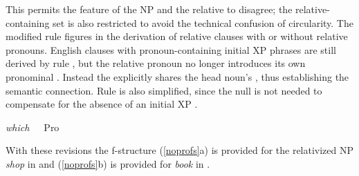 \documentclass[output=paper,hidelinks]{langscibook}
\begin{document}
\noindent This permits the \CASE feature of the NP and the relative  to disagree; the relative-containing \ADJ set is also restricted to avoid the technical confusion of circularity. The modified rule figures in the derivation of relative clauses with or without relative pronouns.    English clauses with pronoun-containing initial XP phrases are still derived by rule , but the relative pronoun no longer introduces its own pronominal \PRED {}.  Instead the  explicitly shares the head noun's \PRED, thus establishing the semantic connection.  Rule  is also simplified, since the null  is not needed to compensate for the absence of an initial XP .

\ea
\ea\label{whichnopro}
\textit{which}\ \ \ Pro\ \ \ 
\ex\label{restrictthat}
\\[1ex]
\z\z

\noindent With these revisions the f-structure (\ref{noprofs}a) is provided for the relativized NP \textit{shop} in  and (\ref{noprofs}b) is provided for \textit{book} in .
  
\end{document}
